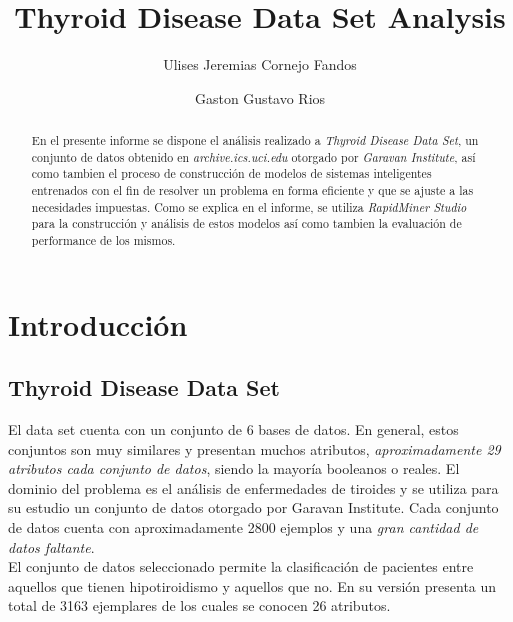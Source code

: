 \documentclass[osajnl,twocolumn,showpacs,superscriptaddress,10pt,floatfix]{revtex4-1} %
\begin{document}
\title{Thyroid Disease Data Set Analysis}

\author{Ulises Jeremias Cornejo Fandos}

\author{Gaston Gustavo Rios}


\begin{abstract}
En el presente informe se dispone el análisis realizado a \textit{Thyroid Disease Data Set}, un conjunto de datos obtenido en \textit{archive.ics.uci.edu} otorgado por \textit{Garavan Institute}, así como tambien el proceso de construcción de modelos de sistemas inteligentes entrenados con el fin de resolver un problema en forma eficiente y que se ajuste a las necesidades impuestas. Como se explica en el informe, se utiliza \textit{RapidMiner Studio} para la construcción y análisis de estos modelos así como tambien la evaluación de performance de los mismos. \\
\end{abstract}

\maketitle %

\section{Introducción}

\subsection{Thyroid Disease Data Set}

El data set cuenta con un conjunto de 6 bases de datos. En general, estos conjuntos son muy similares y presentan muchos atributos, \textit{aproximadamente 29 atributos cada conjunto de datos}, siendo la mayoría booleanos o reales. El dominio del problema es el análisis de enfermedades de tiroides y se utiliza para su estudio un conjunto de datos otorgado por Garavan Institute. Cada conjunto de datos cuenta con aproximadamente 2800 ejemplos y una \textit{gran cantidad de datos faltante}. \\

El conjunto de datos seleccionado permite la clasificación de pacientes entre aquellos que tienen hipotiroidismo y aquellos que no. En su versión presenta un total de 3163 ejemplares de los cuales se conocen 26 atributos. \\
\end{document}
